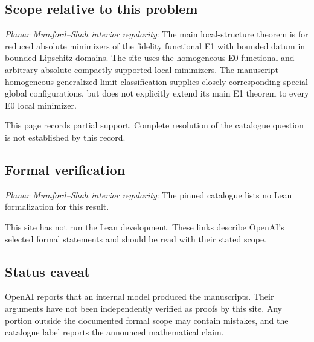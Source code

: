 \documentclass[11pt]{article}
\begin{document}
\subsection{Scope relative to this problem}
\textit{Planar Mumford--Shah interior regularity}: The main local-structure theorem is for reduced absolute minimizers of the fidelity functional E1 with bounded datum in bounded Lipschitz domains. The site uses the homogeneous E0 functional and arbitrary absolute compactly supported local minimizers. The manuscript homogeneous generalized-limit classification supplies closely corresponding special global configurations, but does not explicitly extend its main E1 theorem to every E0 local minimizer.

This page records partial support. Complete resolution of the catalogue question is not established by this record.

\subsection{Formal verification}
\textit{Planar Mumford--Shah interior regularity}: The pinned catalogue lists no Lean formalization for this result.

This site has not run the Lean development. These links describe OpenAI’s selected formal statements and should be read with their stated scope.

\subsection{Status caveat}
OpenAI reports that an internal model produced the manuscripts. Their arguments have not been independently verified as proofs by this site. Any portion outside the documented formal scope may contain mistakes, and the catalogue label reports the announced mathematical claim.
\end{document}
